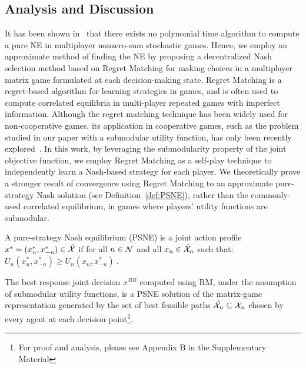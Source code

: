 \subsection{Analysis and Discussion}
It has been shown in~\citep{berg2017exclusion} that there exists no polynomial time algorithm to compute a pure NE in multiplayer nonzero-sum stochastic games. Hence, we employ an approximate method of finding the NE by proposing a decentralized Nash selection method based on Regret Matching for making choices in a multiplayer matrix game formulated at each decision-making state. Regret Matching is a regret-based algorithm for learning strategies in games, and is often used to compute correlated equilibria in multi-player repeated games with imperfect information. Although the regret matching technique has been widely used for non-cooperative games, its application in cooperative games, such as the problem studied in our paper with a submodular utility function, has only been recently explored~\citep{nguyen2023social}. In this work, by leveraging the submodularity property of the joint objective function, we employ Regret Matching as a self-play technique to independently learn a Nash-based strategy for each player. We theoretically prove a stronger result of convergence using Regret Matching to an approximate pure-strategy Nash solution (see Definition~\ref{def:PSNE}), rather than the commonly-used correlated equilibrium, in games where players' utility functions are submodular.

\begin{definition}\label{def:PSNE}
A pure-strategy Nash equilibrium (PSNE) is a joint action profile $x^*=(x^*_n,x^*_{-n}) \in \hat{\mathcal{X}}$ if for all $n\in \mathcal{N}$ and all $x_n \in \hat{\mathcal{X}}_n$ such that: 
$U_n(x^*_n,x^*_{-n}) \geq U_n(x_n,x^*_{-n})\ .$ 
\end{definition}

\begin{theorem}
\label{theorem:PSNE_convergence}
The best response joint decision $x^{BR}$ computed using RM, under the assumption of submodular utility functions, is a PSNE solution of the matrix-game representation generated by the set of best feasible paths $\hat{\mathcal{X}_n}\subseteq \mathcal{X}_n$ chosen by every agent at each decision point\footnote{For proof and analysis, please see Appendix B in the Supplementary Material }.
\end{theorem}


